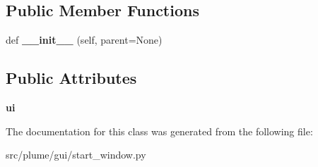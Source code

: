 \subsection*{Public Member Functions}
\begin{DoxyCompactItemize}
\item 
def {\bfseries \+\_\+\+\_\+init\+\_\+\+\_\+} (self, parent=None)\hypertarget{classplume-creator_1_1src_1_1plume_1_1gui_1_1start__window_1_1_start_window_a7571c558bc8fcafd64e85ada225f5f35}{}\label{classplume-creator_1_1src_1_1plume_1_1gui_1_1start__window_1_1_start_window_a7571c558bc8fcafd64e85ada225f5f35}

\end{DoxyCompactItemize}
\subsection*{Public Attributes}
\begin{DoxyCompactItemize}
\item 
{\bfseries ui}\hypertarget{classplume-creator_1_1src_1_1plume_1_1gui_1_1start__window_1_1_start_window_a0c4f21199e90dcce001a06082475f949}{}\label{classplume-creator_1_1src_1_1plume_1_1gui_1_1start__window_1_1_start_window_a0c4f21199e90dcce001a06082475f949}

\end{DoxyCompactItemize}


The documentation for this class was generated from the following file\+:\begin{DoxyCompactItemize}
\item 
src/plume/gui/start\+\_\+window.\+py\end{DoxyCompactItemize}
